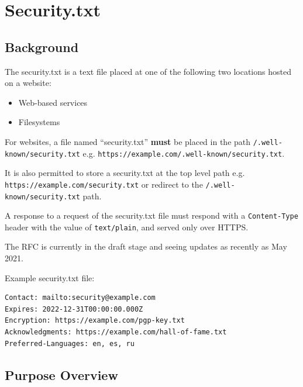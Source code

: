 \documentclass{mscreport}
\begin{document}
\clearpage
\newpage


\section{Security.txt}
\label{section:security_txt}

\subsection{Background}
The security.txt is a text file placed at one of the following two locations hosted on a website:

\begin{itemize}
  \item Web-based services
  \item Filesystems
\end{itemize}

\vspace{0.3cm} \noindent
For websites, a file named ``security.txt'' \textbf{must} be placed in the path \texttt{/.well-known/security.txt} e.g. \texttt{https://example.com/.well-known/security.txt}.

\vspace{0.3cm} \noindent
It is also permitted to store a security.txt at the top level path e.g. \texttt{https://example.com/security.txt} or redirect to the \texttt{/.well-known/security.txt} path.

\vspace{0.3cm} \noindent
A response to a request of the security.txt file must respond with a \texttt{Content-Type} header with the value of \texttt{text/plain}, and served only over HTTPS.

\vspace{0.3cm} \noindent
The RFC is currently in the draft stage and seeing updates as recently as May 2021.

\vspace{0.3cm} \noindent
Example security.txt file:

\begin{lstlisting}
Contact: mailto:security@example.com
Expires: 2022-12-31T00:00:00.000Z
Encryption: https://example.com/pgp-key.txt
Acknowledgments: https://example.com/hall-of-fame.txt
Preferred-Languages: en, es, ru
\end{lstlisting}

\subsection{Purpose Overview}
\end{document}
